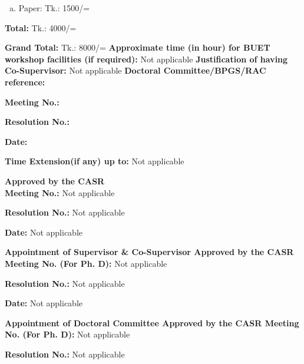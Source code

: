 \documentclass[12pt,addpoints,fleqn]{exam}
\begin{document}
\begin{questions}
\begin{enumerate}[(a)]
\begin{enumerate}[a.]
\item Paper: Tk.: 1500/=
\end{enumerate}
\textbf{Total:} Tk.: 4000/=
\end{enumerate}
\textbf{Grand Total:} Tk.: 8000/=
{\bfseries \question
\textbf{Approximate time (in hour) for BUET workshop facilities (if required):}} Not applicable
{\bfseries \question
\textbf{Justification of having Co-Supervisor:}} Not applicable
{\bfseries \question
\textbf{Doctoral Committee/BPGS/RAC reference:}}\\
\begin{minipage}[t]{0.3\textwidth}
\textbf{Meeting No.: }
\end{minipage}
\begin{minipage}[t]{0.3\textwidth}
\textbf{Resolution No.: }
\end{minipage}
\begin{minipage}[t]{0.3\textwidth}
\textbf{Date:}
\end{minipage}
\iffalse
\begin{minipage}[t]{0.3\textwidth}
\textbf{}
\end{minipage}
\fi
{\bfseries \question
\textbf{Time Extension(if any) up to:}} Not applicable\\
\begin{minipage}[t]{0.3\textwidth}
\textbf{Approved by the CASR\\Meeting No.: }Not applicable
\end{minipage}
\begin{minipage}[t]{0.3\textwidth}
\textbf{Resolution No.: }Not applicable
\end{minipage}
\begin{minipage}[t]{0.3\textwidth}
\textbf{Date:} Not applicable
\end{minipage}
{\bfseries \question
\textbf{Appointment of Supervisor \& Co-Supervisor Approved by the CASR Meeting No. (For Ph. D):}} Not applicable\\
\begin{minipage}[t]{0.45\textwidth}
\textbf{Resolution No.: }Not applicable
\end{minipage}
\begin{minipage}[t]{0.45\textwidth}
\textbf{Date:} Not applicable
\end{minipage}
{\bfseries \question
\textbf{Appointment of Doctoral Committee Approved by the CASR Meeting No. (For Ph. D):}} Not applicable\\
\begin{minipage}[t]{0.45\textwidth}
\textbf{Resolution No.: }Not applicable

\end{minipage}
\end{questions}
\end{document}
